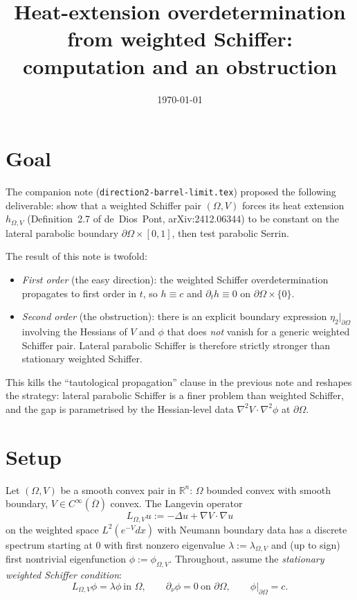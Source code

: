 \documentclass[11pt]{article}
\title{Heat-extension overdetermination from weighted Schiffer:\\
computation and an obstruction}
\author{}
\date{\today}
\newcommand{\R}{\mathbb{R}}
\newcommand{\Om}{\Omega}
\newcommand{\1}{\mathbf 1}
\newcommand{\nor}{\partial_\nu}
\begin{document}
\maketitle

\section{Goal}

The companion note (\texttt{direction2-barrel-limit.tex}) proposed
the following deliverable: show that a weighted Schiffer pair
$(\Om,V)$ forces its heat extension $h_{\Om,V}$ (Definition~2.7 of
de~Dios~Pont, arXiv:2412.06344) to be constant on the lateral parabolic
boundary $\partial\Om\times[0,1]$, then test parabolic Serrin.

The result of this note is twofold:

\begin{itemize}[leftmargin=*]
    \item \emph{First order} (the easy direction): the weighted Schiffer
    overdetermination propagates to first order in $t$, so
    $h\equiv c$ and $\partial_t h\equiv 0$ on $\partial\Om\times\{0\}$.
    \item \emph{Second order} (the obstruction): there is an explicit
    boundary expression $\eta_2|_{\partial\Om}$ involving the Hessians
    of $V$ and $\phi$ that does \emph{not} vanish for a generic
    weighted Schiffer pair. Lateral parabolic Schiffer is therefore
    strictly stronger than stationary weighted Schiffer.
\end{itemize}

This kills the ``tautological propagation'' clause in the previous
note and reshapes the strategy: lateral parabolic Schiffer is a finer
problem than weighted Schiffer, and the gap is parametrised by the
Hessian-level data $\nabla^2 V\cdot\nabla^2\phi$ at $\partial\Om$.

\section{Setup}

Let $(\Om,V)$ be a smooth convex pair in $\R^n$: $\Om$ bounded
convex with smooth boundary, $V\in C^\infty(\overline\Om)$ convex.
The Langevin operator
\[
    L_{\Om,V}u := -\Delta u+\nabla V\cdot\nabla u
\]
on the weighted space $L^2(e^{-V}dx)$ with Neumann boundary data has
a discrete spectrum starting at $0$ with first nonzero eigenvalue
$\lambda := \lambda_{\Om,V}$ and (up to sign) first nontrivial
eigenfunction $\phi := \phi_{\Om,V}$. Throughout, assume the
\emph{stationary weighted Schiffer condition}:
\begin{equation}
\label{eq:wschiffer}
    L_{\Om,V}\phi=\lambda\phi\ \text{in }\Om,\qquad
    \nor\phi=0\ \text{on }\partial\Om,\qquad
    \phi|_{\partial\Om}=c.
\end{equation}
\end{document}
